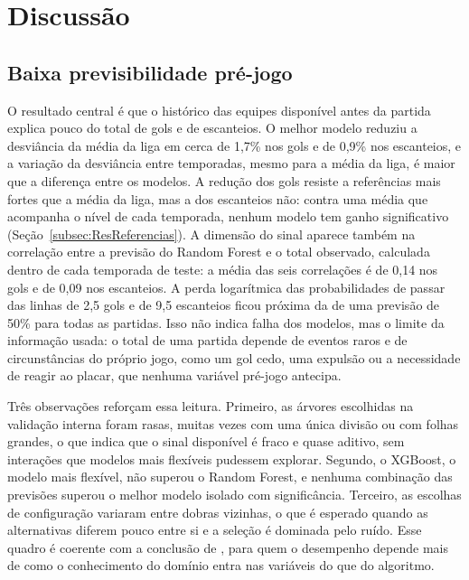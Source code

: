 \section{Discussão}\label{sec:Discussion}

\subsection{Baixa previsibilidade pré-jogo}\label{subsec:DiscPrevisibilidade}

O resultado central é que o histórico das equipes disponível antes da partida explica pouco do total de gols e de escanteios. O melhor modelo reduziu a desviância da média da liga em cerca de 1,7\% nos gols e de 0,9\% nos escanteios, e a variação da desviância entre temporadas, mesmo para a média da liga, é maior que a diferença entre os modelos. A redução dos gols resiste a referências mais fortes que a média da liga, mas a dos escanteios não: contra uma média que acompanha o nível de cada temporada, nenhum modelo tem ganho significativo (Seção~\ref{subsec:ResReferencias}). A dimensão do sinal aparece também na correlação entre a previsão do Random Forest e o total observado, calculada dentro de cada temporada de teste: a média das seis correlações é de 0,14 nos gols e de 0,09 nos escanteios. A perda logarítmica das probabilidades de passar das linhas de 2,5 gols e de 9,5 escanteios ficou próxima da de uma previsão de 50\% para todas as partidas. Isso não indica falha dos modelos, mas o limite da informação usada: o total de uma partida depende de eventos raros e de circunstâncias do próprio jogo, como um gol cedo, uma expulsão ou a necessidade de reagir ao placar, que nenhuma variável pré-jogo antecipa.

Três observações reforçam essa leitura. Primeiro, as árvores escolhidas na validação interna foram rasas, muitas vezes com uma única divisão ou com folhas grandes, o que indica que o sinal disponível é fraco e quase aditivo, sem interações que modelos mais flexíveis pudessem explorar. Segundo, o XGBoost, o modelo mais flexível, não superou o Random Forest, e nenhuma combinação das previsões superou o melhor modelo isolado com significância. Terceiro, as escolhas de configuração variaram entre dobras vizinhas, o que é esperado quando as alternativas diferem pouco entre si e a seleção é dominada pelo ruído. Esse quadro é coerente com a conclusão de , para quem o desempenho depende mais de como o conhecimento do domínio entra nas variáveis do que do algoritmo.

